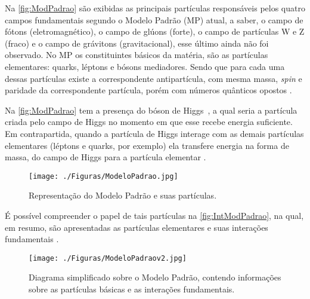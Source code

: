 Na \autoref{fig:ModPadrao} são exibidas as principais partículas responsáveis pelos quatro campos fundamentais segundo o Modelo Padrão (MP) atual, a saber, o campo de fótons (eletromagnético), o campo de glúons (forte), o campo de partículas W e Z (fraco) e o campo de grávitons (gravitacional), esse último ainda não foi observado. No MP os constituintes básicos da matéria, são as partículas elementares: quarks, léptons e bósons mediadores. Sendo que para cada uma dessas partículas existe a correspondente antipartícula, com mesma massa, \textit{spin} e paridade da correspondente partícula, porém com números quânticos opostos \cite{pimenta2013, book:Braibant2012, book:Ellwanger2012}.

Na \autoref{fig:ModPadrao} tem a presença do bóson de Higgs~\cite[Cap. 7]{book:Ellwanger2012}, a qual seria a partícula criada pelo campo de Higgs no momento em que esse recebe energia suficiente. Em contrapartida, quando a partícula de Higgs interage com as demais partículas elementares (léptons e quarks, por exemplo) ela transfere energia na forma de massa, do campo de Higgs para a partícula elementar \cite{pimenta2013}.

\begin{figure}[H]
   \begin{center}
      \caption{Representação do Modelo Padrão e suas partículas.}
      \texttt{[image: ./Figuras/ModeloPadrao.jpg]}
      \label{fig:ModPadrao}
    \end{center}
\end{figure}

 É possível compreender o papel de tais partículas na \autoref{fig:IntModPadrao}, na qual, em resumo, são apresentadas as partículas elementares e suas interações fundamentais \cite{moreira2009}.
 
\begin{figure}[H]
   \begin{center}
      \caption{Diagrama simplificado sobre o Modelo Padrão, contendo informações sobre as partículas básicas e as interações fundamentais.}
      \texttt{[image: ./Figuras/ModeloPadraov2.jpg]}
      \label{fig:IntModPadrao}
    \end{center}
\end{figure}


